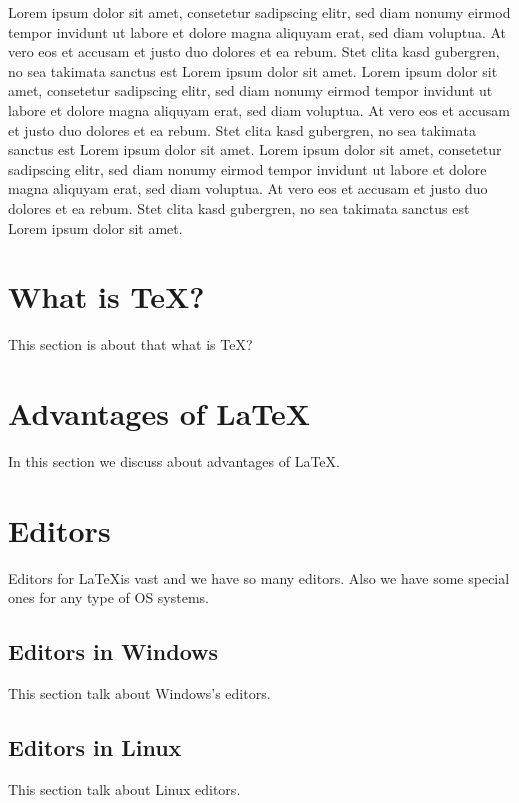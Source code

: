 \documentclass[12pt, a4paper, onecolumn]{article}
\begin{document}
		Lorem ipsum dolor sit amet, consetetur sadipscing elitr, sed diam nonumy eirmod tempor invidunt ut labore et dolore magna aliquyam erat, sed diam voluptua. At vero eos et accusam et justo duo dolores et ea rebum. Stet clita kasd gubergren, no sea takimata sanctus est Lorem ipsum dolor sit amet. Lorem ipsum dolor sit amet, consetetur sadipscing elitr, sed diam nonumy eirmod tempor invidunt\cite{Green95,Markovski09,Tierney94} ut labore et dolore magna aliquyam erat, sed diam voluptua. At vero eos et accusam et justo duo dolores et ea rebum. Stet clita kasd gubergren, no sea takimata sanctus est Lorem ipsum dolor sit amet. Lorem ipsum dolor sit amet, consetetur sadipscing elitr, sed diam nonumy eirmod tempor invidunt ut labore et dolore magna aliquyam erat, sed diam voluptua. At vero eos et accusam et justo\cite{Green95} duo dolores et ea rebum. Stet clita kasd gubergren, no sea takimata sanctus est Lorem ipsum dolor sit amet\cite{Tierney94}.
	
	\section{What is \TeX?} \label{what is tex?}
		This section\cite{Tierney94} is about that what is \TeX?
	
	\section{Advantages of \LaTeX}\label{advantages}
		In this section we discuss\cite{Green95} about advantages\cite{Markovski09} of \LaTeX.
	
	\section{Editors} \label{editors}
		Editors for \LaTeX is vast and we have so many editors. Also we have some special ones for any type of OS systems.
	
	\subsection{Editors in Windows} \label{editor.win} %
		This section talk\cite{Green95,Tierney94} about Windows's editors.
	
	\subsection{Editors in Linux} \label{editor.linux} 
		This section talk about Linux\cite{Green95,Markovski09,Tierney94} editors.
	
\end{document}
